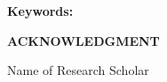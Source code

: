 {}



\vspace{1cm}

\noindent
\textbf{Keywords:} 




\newpage

\begin{center}
	\Large	\textbf{ACKNOWLEDGMENT}
\end{center}

{}



\vspace{2cm}

\begin{flushright}
	Name of Research Scholar
\end{flushright}
